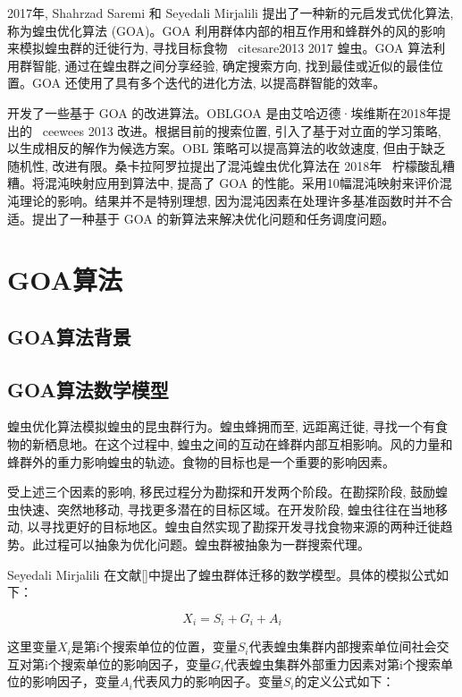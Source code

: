 2017年, Shahrzad Saremi 和 Seyedali Mirjalili 提出了一种新的元启发式优化算法, 称为蝗虫优化算法 (GOA)。GOA 利用群体内部的相互作用和蜂群外的风的影响来模拟蝗虫群的迁徙行为, 寻找目标食物 \ citesare2013 2017 蝗虫。GOA 算法利用群智能, 通过在蝗虫群之间分享经验, 确定搜索方向, 找到最佳或近似的最佳位置。GOA 还使用了具有多个迭代的进化方法, 以提高群智能的效率。

开发了一些基于 GOA 的改进算法。OBLGOA 是由艾哈迈德·埃维斯在2018年提出的 \ ceewees 2013 改进。根据目前的搜索位置, 引入了基于对立面的学习策略, 以生成相反的解作为候选方案。OBL 策略可以提高算法的收敛速度, 但由于缺乏随机性, 改进有限。桑卡拉阿罗拉提出了混沌蝗虫优化算法在 2018年 \ 柠檬酸乱糟糟。将混沌映射应用到算法中, 提高了 GOA 的性能。采用10幅混沌映射来评价混沌理论的影响。结果并不是特别理想, 因为混沌因素在处理许多基准函数时并不合适。提出了一种基于 GOA 的新算法来解决优化问题和任务调度问题。

\section{GOA算法}\label{sec:task_scheduling_GOA}
\subsection{GOA算法背景}
\subsection{GOA算法数学模型}
蝗虫优化算法模拟蝗虫的昆虫群行为。蝗虫蜂拥而至, 远距离迁徙, 寻找一个有食物的新栖息地。在这个过程中, 蝗虫之间的互动在蜂群内部互相影响。风的力量和蜂群外的重力影响蝗虫的轨迹。食物的目标也是一个重要的影响因素。

受上述三个因素的影响, 移民过程分为勘探和开发两个阶段。在勘探阶段, 鼓励蝗虫快速、突然地移动, 寻找更多潜在的目标区域。在开发阶段, 蝗虫往往在当地移动, 以寻找更好的目标地区。蝗虫自然实现了勘探开发寻找食物来源的两种迁徙趋势。此过程可以抽象为优化问题。蝗虫群被抽象为一群搜索代理。

Seyedali Mirjalili 在文献[]中提出了蝗虫群体迁移的数学模型。具体的模拟公式如下：

\begin{equation}
    X_i = S_i + G_i + A_i 
\end{equation}

这里变量$X_i$是第i个搜索单位的位置，变量$S_i$代表蝗虫集群内部搜索单位间社会交互对第i个搜索单位的影响因子，变量$G_i$代表蝗虫集群外部重力因素对第i个搜索单位的影响因子，变量$A_i$代表风力的影响因子。变量$S_i$的定义公式如下：


